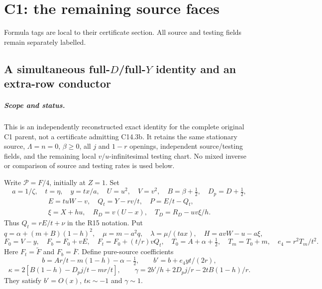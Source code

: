 \chapter{C1: the remaining source faces}
\label{ch:cert-4}
Formula tags are local to their certificate section. All source and testing fields remain separately labelled.

\section{\texorpdfstring{A simultaneous full-$D$/full-$Y$ identity and an extra-row conductor}{A simultaneous full-D/full-Y identity and an extra-row conductor}}
\label{component:pa73a17051258}

\paragraph{Scope and status.}
This is an independently reconstructed exact identity for the complete
original C1 parent, not a certificate admitting C14.3b. It retains the
same stationary source, $\Lambda=n=0$, $\beta\ge0$, all $j$ and $1-r$
openings, independent source/testing fields, and the remaining local
$v/u$-infinitesimal testing chart. No mixed inverse or comparison of
source and testing rates is used below.

Write $\mathcal P=F/4$, initially at $Z=1$. Set
\[
 a=1/\zeta,\quad t=\eta,\quad y=tx/a,\quad U=u^2,\quad V=v^2,
 \quad B=\beta+\tfrac12,\quad D_p=D+\tfrac12,
\]
\[
 \begin{gathered}
 E=tuW-v,\quad Q_t=Y-rv/t,\quad P=E/t-Q_t,\\
 \xi=X+hu,\quad R_D=v(U-x),\quad T_D=R_D-uv\xi/h.
 \end{gathered}
\]
Thus $Q_t=rE/t+\nu$ in the R15 notation. Put
\[
 q=\alpha+(m+B)(1-h)^2,\quad\mu=m-a^2q,
 \quad\lambda=\mu/(tax),\quad H=avW-u-a\xi,
\]
\[
 F_0=V-y,\quad F_b=F_0+vE,\quad F_t=F_0+(t/r)vQ_t,
 \quad T_0=A+\alpha+\tfrac12,\quad T_m=T_0+m,
 \quad e_4=r^2T_m/t^2.
\]
Here $F_t=\widetilde F$ and $F_b=\overline F$. Define pure-source
coefficients
\[
 b=Ar/t-m(1-h)-\alpha-\tfrac12,\qquad
 b'=b+e_4yt/(2r),
\]
\[
 \kappa=2[B(1-h)-D_pj/t-mr/t],\qquad
 \gamma=2b'/h+2D_pj/r-2tB(1-h)/r.
\]
They satisfy $b'=O(x)$, $t\kappa\sim-1$ and $\gamma\sim1$.

